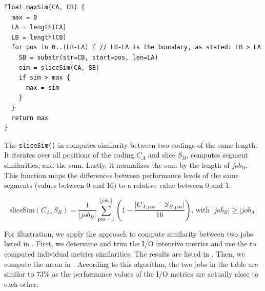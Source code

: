 \documentclass{jhps}
\begin{document}
\begin{lstlisting}[caption={Pseudo code of the maxSim() function}]
float maxSim(CA, CB) {
  max = 0
  LA = length(CA)
  LB = length(CB)
  for pos in 0..(LB-LA) { // LB-LA is the boundary, as stated: LB > LA
    SB = substr(str=CB, start=pos, len=LA)
    sim = sliceSim(CA, SB)
    if sim > max {
      max = sim
    }
  }
  return max
}
\end{lstlisting}

The \texttt{sliceSim()} in  computes similarity between two codings of the same length.
It iterates over all positions of the coding $C_A$ and slice $S_B$, computes segment similarities, and the sum.
Lastly, it normalizes the sum by the length of $job_B$.
This function maps the differences between performance levels of the same segments (values between 0 and 16) to a relative value between 0 and 1.

\begin{equation}
	\text{sliceSim}\left(C_{A},S_{B}\right) = \frac{1}{|job_B|}\sum_{\text{pos}=1}^{|job_A|} \left(1 - \frac{\vert C_{A,\text{pos}}-S_{B,\text{pos}} \vert }{16}\right)\text{, with }|job_{B}| \geq |job_{A}| \label{eq:slicesim}
\end{equation}

For illustration, we apply the approach to compute similarity between two jobs listed in .
First, we determine and trim the I/O intensive metrics and use the  to computed individual metrics similarities.
The results are listed in .
Then, we compute the mean in .
According to this algorithm, the two jobs in the table are similar to 73\% as the performance values of the I/O metrics are actually close to each other.
\end{document}
